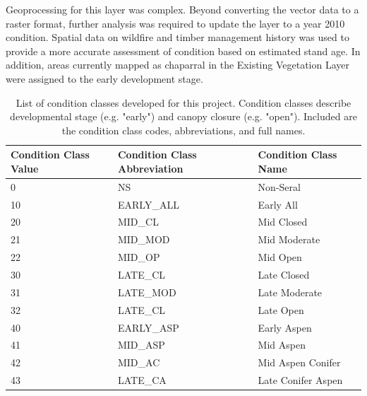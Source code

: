 Geoprocessing for this layer was complex. Beyond converting the vector data to a raster format, further analysis was required to update the layer to a year 2010 condition. Spatial data on wildfire and timber management history was used to provide a more accurate assessment of condition based on estimated stand age. In addition, areas currently mapped as chaparral in the Existing Vegetation Layer were assigned to the early development stage.


\begin{table}[!htbp]
\caption{List of condition classes developed for this project. Condition classes describe developmental stage (e.g. "early") and canopy closure (e.g. "open"). Included are the condition class codes, abbreviations, and full names.}
\label{condtable}
\begin{tabular}{@{}lll@{}}
\toprule
\textbf{Condition Class Value} & \textbf{Condition Class Abbreviation} & \textbf{Condition Class Name} \\ \midrule
\rowcolor[HTML]{CAD6BA} 
0                              & NS                                    & Non-Seral                     \\
10                             & EARLY\_ALL                            & Early All                     \\
\rowcolor[HTML]{CAD6BA} 
20                             & MID\_CL                               & Mid Closed                    \\
21                             & MID\_MOD                              & Mid Moderate                  \\
\rowcolor[HTML]{CAD6BA} 
22                             & MID\_OP                               & Mid Open                      \\
30                             & LATE\_CL                              & Late Closed                   \\
\rowcolor[HTML]{CAD6BA} 
31                             & LATE\_MOD                             & Late Moderate                 \\
32                             & LATE\_CL                              & Late Open                     \\
\rowcolor[HTML]{CAD6BA} 
40                             & EARLY\_ASP                            & Early Aspen                   \\
41                             & MID\_ASP                              & Mid Aspen                     \\
\rowcolor[HTML]{CAD6BA} 
42                             & MID\_AC                               & Mid Aspen Conifer             \\
43                             & LATE\_CA                              & Late Conifer Aspen            \\ \bottomrule
\end{tabular}
\end{table}
